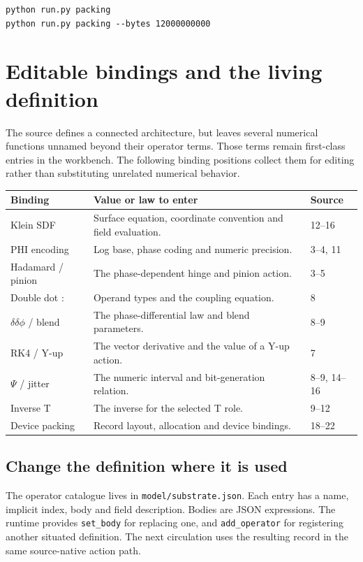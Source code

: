 \documentclass[11pt,a4paper]{article}
\newcommand{\code}[1]{\texttt{#1}}
\begin{document}
\begin{lstlisting}
python run.py packing
python run.py packing --bytes 12000000000
\end{lstlisting}
\clearpage

\section{Editable bindings and the living definition}
The source defines a connected architecture, but leaves several numerical functions unnamed beyond their operator terms. Those terms remain first-class entries in the workbench. The following binding positions collect them for editing rather than substituting unrelated numerical behavior.

{\small
\begin{tabularx}{\linewidth}{@{}P{35mm}YP{15mm}@{}}
\toprule
\textbf{Binding} & \textbf{Value or law to enter} & \textbf{Source}\\
\midrule
Klein SDF & Surface equation, coordinate convention and field evaluation. & 12--16\\
PHI encoding & Log base, phase coding and numeric precision. & 3--4, 11\\
Hadamard / pinion & The phase-dependent hinge and pinion action. & 3--5\\
Double dot $:$ & Operand types and the coupling equation. & 8\\
$\delta\delta\phi$ / blend & The phase-differential law and blend parameters. & 8--9\\
RK4 / Y-up & The vector derivative and the value of a Y-up action. & 7\\
$\Psi$ / jitter & The numeric interval and bit-generation relation. & 8--9, 14--16\\
Inverse T & The inverse for the selected T role. & 9--12\\
Device packing & Record layout, allocation and device bindings. & 18--22\\
\bottomrule
\end{tabularx}}

\subsection{Change the definition where it is used}
The operator catalogue lives in \code{model/substrate.json}. Each entry has a name, implicit index, body and field description. Bodies are JSON expressions. The runtime provides \code{set\_body} for replacing one, and \code{add\_operator} for registering another situated definition. The next circulation uses the resulting record in the same source-native action path.
\end{document}
